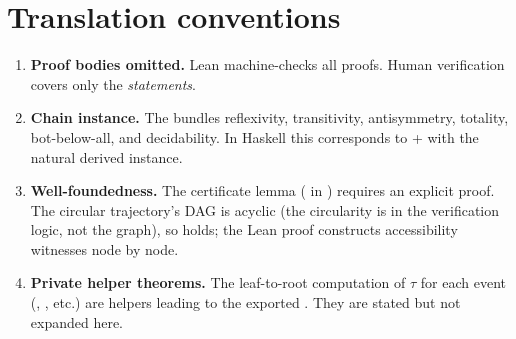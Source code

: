 \documentclass[11pt,a4paper]{article}
\begin{document}
\section{Translation conventions}

\begin{enumerate}
\item \textbf{Proof bodies omitted.}  Lean machine-checks all proofs.  Human
  verification covers only the \emph{statements}.

\item \textbf{Chain instance.}  The  bundles
  reflexivity, transitivity, antisymmetry, totality, bot-below-all, and
  decidability.  In Haskell this corresponds to  +  with
  the natural derived instance.

\item \textbf{Well-foundedness.}  The certificate lemma (
  in ) requires an explicit  proof.  The
  circular trajectory's DAG is acyclic (the circularity is in the verification
  logic, not the graph), so  holds; the Lean proof constructs
  accessibility witnesses node by node.

\item \textbf{Private helper theorems.}  The leaf-to-root computation of
  $\tau$ for each event (, , etc.)
  are  helpers leading to the exported
  .  They are stated but not expanded here.
\end{enumerate}
\end{document}
